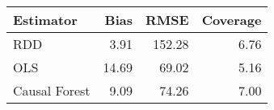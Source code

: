 \begin{table}[ht]
\centering
\begin{tabular}{lrrr}
  \hline
Estimator & Bias & RMSE & Coverage \\ 
  \hline
RDD & 3.91 & 152.28 & 6.76 \\ 
  OLS & 14.69 & 69.02 & 5.16 \\ 
  Causal Forest & 9.09 & 74.26 & 7.00 \\ 
   \hline
\end{tabular}
\end{table}
